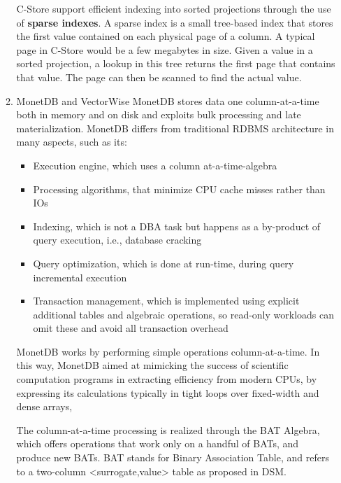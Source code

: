 \documentclass[11pt]{article}
\begin{document}
\begin{enumerate}
\begin{enumerate}
C-Store support efficient indexing into sorted projections through the use of \textbf{sparse indexes}. A sparse
index is a small tree-based index that stores the first value contained on each physical page of a
column. A typical page in C-Store would be a few megabytes in size. Given a value in a sorted
projection, a lookup in this tree returns the first page that contains that value. The page can then
be scanned to find the actual value.
\item MonetDB and VectorWise
\label{sec:orga7f4fe5}
MonetDB stores data one column-at-a-time both in memory and on disk and exploits bulk processing and
late materialization. MonetDB differs from traditional RDBMS architecture in many aspects, such as
its:
\begin{itemize}
\item Execution engine, which uses a column at-a-time-algebra
\item Processing algorithms, that minimize CPU cache misses rather than IOs
\item Indexing, which is not a DBA task but happens as a by-product of query execution, i.e., database cracking
\item Query optimization, which is done at run-time, during query incremental execution
\item Transaction management, which is implemented using explicit additional tables and algebraic
operations, so read-only workloads can omit these and avoid all transaction overhead
\end{itemize}

MonetDB works by performing simple operations column-at-a-time. In this way, MonetDB aimed at
mimicking the success  of scientific computation programs in extracting efficiency from modern CPUs,
by expressing its calculations typically in tight loops over fixed-width and dense arrays,

The column-at-a-time processing is realized through the BAT Algebra, which offers operations that work
only on a handful of BATs, and produce new BATs. BAT stands for Binary Association Table, and refers
to a two-column <surrogate,value> table as proposed in DSM.


\end{enumerate}
\end{enumerate}
\end{document}
